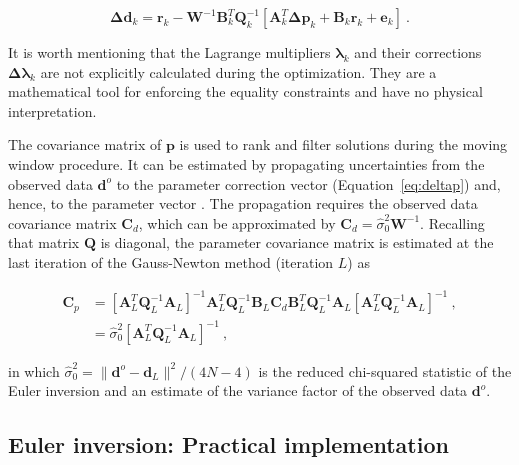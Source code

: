 \begin{equation}
  \mathbf{\Delta d}_k =
  \mathbf{r}_k -
  \mathbf{W}^{-1}\mathbf{B}_k^T\mathbf{Q}_k^{-1}
  \left[\mathbf{A}_k^T\mathbf{\Delta p}_k + \mathbf{B}_k\mathbf{r}_k + \mathbf{e}_k\right]
  \ .
  \label{eq:deltad}
\end{equation}

\noindent
It is worth mentioning that the Lagrange multipliers
$\boldsymbol{\lambda}_k$ and their corrections
$\boldsymbol{\Delta\lambda}_k$ are not explicitly calculated during the
optimization.
They are a mathematical tool for enforcing the equality constraints and have no
physical interpretation.

The covariance matrix of $\mathbf{p}$ is used to rank and filter solutions
during the moving window procedure.
It can be estimated by propagating uncertainties from the observed data
$\mathbf{d}^o$ to the
parameter correction vector (Equation~\ref{eq:deltap}) and, hence, to the
parameter vector \citep{WellsKrakiwsky1971}.
The propagation requires the observed data covariance matrix $\mathbf{C}_d$,
which can be approximated by
$\mathbf{C}_d = \hat{\sigma}_0^2\mathbf{W}^{-1}$.
Recalling that matrix $\mathbf{Q}$ is diagonal,
the parameter covariance matrix is estimated at the last iteration of the
Gauss-Newton method (iteration $L$) as

\begin{equation}
  \begin{aligned}
    \mathbf{C}_{p} &=
      \left[\mathbf{A}_L^T\mathbf{Q}_L^{-1}\mathbf{A}_L\right]^{-1}
      \mathbf{A}_L^T\mathbf{Q}_L^{-1}\mathbf{B}_L
      \mathbf{C}_d
      \mathbf{B}_L^T\mathbf{Q}_L^{-1}\mathbf{A}_L
      \left[\mathbf{A}_L^T\mathbf{Q}_L^{-1}\mathbf{A}_L\right]^{-1}
    \ ,
    \\
    &= \hat{\sigma}_0^2 \left[\mathbf{A}_L^T\mathbf{Q}_L^{-1}\mathbf{A}_L\right]^{-1}
    \ ,
  \end{aligned}
  \label{eq:cov}
\end{equation}

\noindent
in which
$\hat{\sigma}^2_0 = \|\mathbf{d}^o - \mathbf{d}_L\|^2 / (4N - 4)$ is the
reduced chi-squared statistic of the Euler inversion and an estimate of the
variance factor of the observed data $\mathbf{d}^o$.



\subsection{Euler inversion: Practical implementation}

